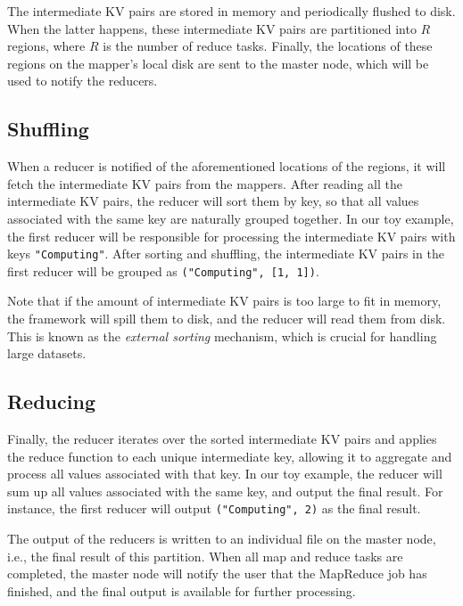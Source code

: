 The intermediate KV pairs are stored in memory and periodically flushed to disk. When the latter happens, these intermediate KV pairs are partitioned into $R$ regions, where $R$ is the number of reduce tasks. Finally, the locations of these regions on the mapper's local disk are sent to the master node, which will be used to notify the reducers.

\subsection{Shuffling}

When a reducer is notified of the aforementioned locations of the regions, it will fetch the intermediate KV pairs from the mappers. After reading all the intermediate KV pairs, the reducer will sort them by key, so that all values associated with the same key are naturally grouped together. In our toy example, the first reducer will be responsible for processing the intermediate KV pairs with keys \texttt{"Computing"}. After sorting and shuffling, the intermediate KV pairs in the first reducer will be grouped as \texttt{("Computing", [1, 1])}.

Note that if the amount of intermediate KV pairs is too large to fit in memory, the framework will spill them to disk, and the reducer will read them from disk. This is known as the \textit{external sorting} mechanism, which is crucial for handling large datasets.

\subsection{Reducing}

Finally, the reducer iterates over the sorted intermediate KV pairs and applies the reduce function to each unique intermediate key, allowing it to aggregate and process all values associated with that key. In our toy example, the reducer will sum up all values associated with the same key, and output the final result. For instance, the first reducer will output \texttt{("Computing", 2)} as the final result. 

The output of the reducers is written to an individual file on the master node, i.e., the final result of this partition. When all map and reduce tasks are completed, the master node will notify the user that the MapReduce job has finished, and the final output is available for further processing.
